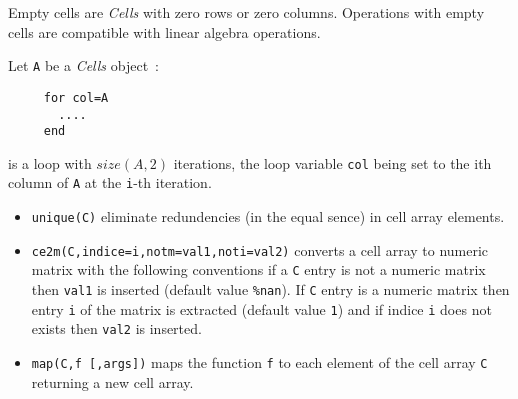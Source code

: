 
Empty cells are \emph{Cells} with zero rows or zero columns. Operations with empty cells
are compatible with linear algebra operations. 

Let \verb+A+ be a \emph{Cells} object~:
\begin{verbatim}
     for col=A
       ....
     end
\end{verbatim} 
is a loop with $size(A,2)$ iterations, the loop 
variable  \verb+col+ being set to the ith column of \verb+A+ at the \verb!i!-th iteration.

\begin{itemize}
   \item \verb+unique(C)+ eliminate redundencies (in the equal sence) in cell array elements. 
   \item \verb+ce2m(C,indice=i,notm=val1,noti=val2)+ converts a cell array to numeric matrix
     with the following conventions if a \verb+C+ entry is not a numeric matrix then \verb!val1! is inserted 
     (default value \verb!%nan!). If \verb+C+ entry is a numeric matrix then entry \verb!i! of the matrix 
     is extracted (default value \verb!1!) and if indice \verb!i! does not exists then \verb!val2! is inserted.
   \item \verb+map(C,f [,args])+ maps the function \verb!f! to each element of the cell array \verb!C! returning 
     a new cell array.
\end{itemize}

